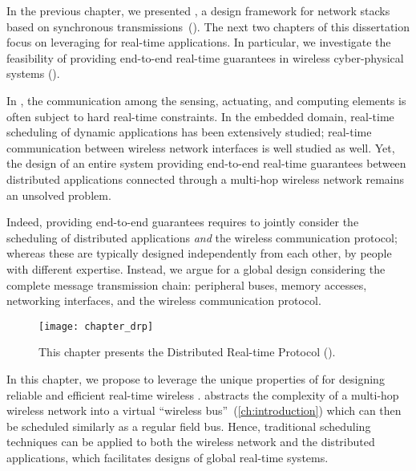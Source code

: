
In the previous chapter, we presented \baloo, a design framework for network stacks based on synchronous transmissions~(\ST).
The next two chapters of this dissertation focus on leveraging \ST for real-time applications.
In particular, we investigate the feasibility of providing end-to-end real-time guarantees in wireless cyber-physical systems (\CPS).

In \CPS, the communication among the sensing, actuating, and computing elements is often subject to hard real-time constraints.
In the embedded domain, real-time scheduling of dynamic applications has been extensively studied; real-time communication between wireless network interfaces is well studied as well.
Yet, the design of an entire system providing end-to-end real-time guarantees between distributed applications connected through a multi-hop wireless network remains an unsolved problem.


Indeed, providing end-to-end guarantees requires to jointly consider the scheduling of distributed applications \emph{and} the wireless communication protocol; whereas these are typically designed independently from each other, by people with different expertise.
Instead, we argue for a global design considering the complete message transmission chain: peripheral buses, memory accesses, networking interfaces, and the wireless communication protocol.

\begin{figure}
  \centering
  \texttt{[image: chapter\_drp]}
  \caption{This chapter presents the Distributed Real-time Protocol (\DRP).
  }
  \label{fig:chapter_drp}
\end{figure}

In this chapter, we propose to leverage the unique properties of \ST for designing reliable and efficient real-time wireless \CPS.
\ST abstracts the complexity of a multi-hop wireless network into a virtual ``wireless bus''~(\cref{ch:introduction}) which can then be scheduled similarly as a regular field bus.
Hence, traditional scheduling techniques can be applied to both the wireless network and the distributed applications, which facilitates designs of global real-time systems.

